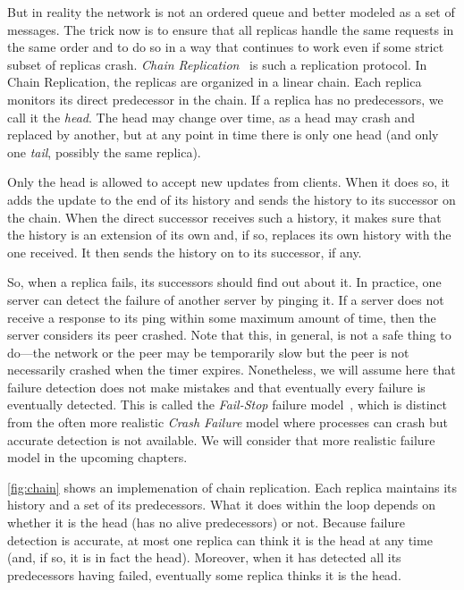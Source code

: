\documentclass{report}
\begin{document}
But in reality the network is not an ordered queue and better modeled
as a set of messages.
The trick now is to ensure that all replicas handle the
same requests in the same order and to do so in a way that continues
to work even if some strict subset of replicas crash.
\emph{Chain Replication}~\cite{vRS04} is such a replication protocol.
In Chain Replication, the replicas are organized in a linear chain.
Each replica monitors its direct predecessor in the chain.  If a replica has
no predecessors, we call it the \emph{head}.  The head may change over
time, as a head may crash and replaced by another, but at any point in
time there is only one head
(and only one \emph{tail}, possibly the same replica).

Only the head is allowed to accept new updates from clients.
When it does so, it adds the update to the end of its history
and sends the history to its successor on the chain.
When the direct successor receives such a history, it makes sure
that the history is an extension of its own and, if so, replaces its own
history with the one received.
It then sends the history on to its successor, if any.

So, when a replica fails, its successors should find out about it.
In practice, one server can detect the failure of another server by
pinging it.  If a server does not receive a response to its ping within
some maximum amount of time, then the server considers its peer crashed.
Note that this, in general, is not a safe thing to do---the network or
the peer may be temporarily slow but the peer is not necessarily crashed
when the timer expires.
Nonetheless, we will assume here that failure detection does not make
mistakes and that eventually every failure is eventually detected.
This is called the \emph{Fail-Stop} failure model~\cite{SS83},
which is distinct from the often more realistic \emph{Crash Failure} model
where processes can crash but accurate detection is not available.
We will consider that more realistic failure model in the upcoming chapters.

\autoref{fig:chain} shows an implemenation of chain replication.
Each replica maintains its history and a set of its predecessors.
What it does within the loop depends on whether it is the head
(has no alive predecessors) or not.
Because failure detection is accurate, at most one replica can think
it is the head at any time (and, if so, it is in fact the head).
Moreover, when it has
detected all its predecessors having failed, eventually some replica
thinks it is the head.
\end{document}
